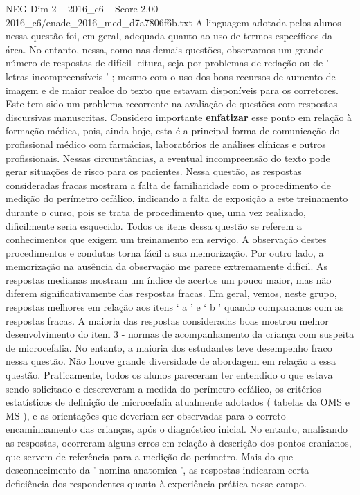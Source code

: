 \begin{textsample}{NEG Dim 2 – 2016\_c6 – Score 2.00 – 2016\_c6/enade\_2016\_med\_d7a7806f6b.txt}
A linguagem adotada pelos alunos nessa questão foi, em geral, adequada quanto ao uso de termos específicos da área.
No entanto, nessa, como nas demais questões, observamos um grande número de respostas de difícil leitura, seja por problemas de redação ou de ' letras incompreensíveis ' ; mesmo com o uso dos bons recursos de aumento de imagem e de maior realce do texto que estavam disponíveis para os corretores.
Este tem sido um problema recorrente na avaliação de questões com respostas discursivas manuscritas.
Considero importante \textbf{enfatizar} esse ponto em relação à formação médica, pois, ainda hoje, esta é a principal forma de comunicação do profissional médico com farmácias, laboratórios de análises clínicas e outros profissionais.
Nessas circunstâncias, a eventual incompreensão do texto pode gerar situações de risco para os pacientes.
Nessa questão, as respostas consideradas fracas mostram a falta de familiaridade com o procedimento de medição do perímetro cefálico, indicando a falta de exposição a este treinamento durante o curso, pois se trata de procedimento que, uma vez realizado, dificilmente seria esquecido.
Todos os itens dessa questão se referem a conhecimentos que exigem um treinamento em serviço.
A observação destes procedimentos e condutas torna fácil a sua memorização.
Por outro lado, a memorização na ausência da observação me parece extremamente difícil.
As respostas medianas mostram um índice de acertos um pouco maior, mas não diferem significativamente das respostas fracas.
Em geral, vemos, neste grupo, respostas melhores em relação aos itens ‘ a ’ e ‘ b ’ quando comparamos com as respostas fracas.
A maioria das respostas consideradas boas mostrou melhor desenvolvimento do item 3 - normas de acompanhamento da criança com suspeita de microcefalia.
No entanto, a maioria dos estudantes teve desempenho fraco nessa questão.
Não houve grande diversidade de abordagem em relação a essa questão.
Praticamente, todos os alunos pareceram ter entendido o que estava sendo solicitado e descreveram a medida do perímetro cefálico, os critérios estatísticos de definição de microcefalia atualmente adotados ( tabelas da OMS e MS ), e as orientações que deveriam ser observadas para o correto encaminhamento das crianças, após o diagnóstico inicial.
No entanto, analisando as respostas, ocorreram alguns erros em relação à descrição dos pontos cranianos, que servem de referência para a medição do perímetro.
Mais do que desconhecimento da ' nomina anatomica ', as respostas indicaram certa deficiência dos respondentes quanta à experiência prática nesse campo.

\end{textsample}
